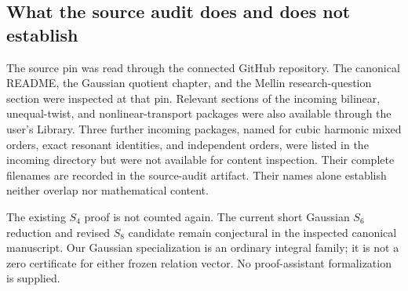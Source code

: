 \subsection{What the source audit does and does not establish}
The source pin was read through the connected GitHub repository. The
canonical README, the Gaussian quotient chapter, and the Mellin
research-question section were inspected at that pin. Relevant sections
of the incoming bilinear, unequal-twist, and nonlinear-transport packages
were also available through the user's Library. Three further incoming packages, named for cubic harmonic mixed orders,
exact resonant identities, and independent orders, were listed in the
incoming directory but were not available for content inspection. Their
complete filenames are recorded in the source-audit artifact.
Their names alone establish neither overlap nor mathematical content.

The existing $S_4$ proof is not counted again. The current short Gaussian
$S_6$ reduction and revised $S_8$ candidate remain conjectural in the
inspected canonical manuscript. Our Gaussian specialization is an
ordinary integral family; it is not a zero certificate for either
frozen relation vector. No proof-assistant formalization is supplied.
